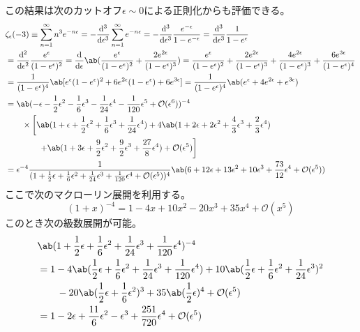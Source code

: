 この結果は次のカットオフ$\epsilon\sim0$による正則化からも評価できる。
\begin{equation}
  \begin{split}
    &\zeta_\epsilon(-3)
    \equiv
    \sum_{n=1}^\infty n^3e^{-n\epsilon}
    =-\odv[order=3]{}{\epsilon} \sum_{n=1}^\infty e^{-n\epsilon}
    =-\odv[order=3]{}{\epsilon} \frac{e^{-\epsilon}}{1-e^{-\epsilon}}
    =\odv[order=3]{}{\epsilon} \frac{1}{1-e^\epsilon} \\
    &=\odv[order=2]{}{\epsilon} \frac{e^\epsilon}{(1-e^\epsilon)^2}
    =\odv{}{\epsilon}\ab(
    \frac{e^\epsilon}{(1-e^\epsilon)^2}
    +\frac{2e^{2\epsilon}}{(1-e^\epsilon)^3}
    )
    =\frac{e^\epsilon}{(1-e^\epsilon)^2}
    +\frac{2e^{2\epsilon}}{(1-e^\epsilon)^3}
    +\frac{4e^{2\epsilon}}{(1-e^\epsilon)^3}
    +\frac{6e^{3\epsilon}}{(1-e^\epsilon)^4} \\
    &=\frac{1}{(1-e^\epsilon)^4}
    \ab[e^\epsilon(1-e^\epsilon)^2+6e^{2\epsilon}(1-e^\epsilon)+6e^{3\epsilon}]
    =\frac{1}{(1-e^\epsilon)^4}
    \ab(e^\epsilon+4e^{2\epsilon}+e^{3\epsilon}) \\
    &=\ab(
    -\epsilon-\frac{1}{2}\epsilon^2-\frac{1}{6}\epsilon^3
    -\frac{1}{24}\epsilon^4-\frac{1}{120}\epsilon^5+\mathcal{O}(\epsilon^6)
    )^{-4} \\
    &\qquad\times\left[
      \ab(1+\epsilon+\frac{1}{2}\epsilon^2+\frac{1}{6}\epsilon^3+\frac{1}{24}\epsilon^4)
      +4\ab(1+2\epsilon+2\epsilon^2+\frac{4}{3}\epsilon^3+\frac{2}{3}\epsilon^4)\right. \\
      &\qquad\qquad\left.
      +\ab(1+3\epsilon+\frac{9}{2}\epsilon^2+\frac{9}{2}\epsilon^3+\frac{27}{8}\epsilon^4)
      +\mathcal{O}(\epsilon^5)
      \right] \\
    &=\epsilon^{-4}\frac{1}{
      (1+\frac{1}{2}\epsilon+\frac{1}{6}\epsilon^2+\frac{1}{24}\epsilon^3
      +\frac{1}{120}\epsilon^4+\mathcal{O}(\epsilon^5))^4}
    \ab(
    6+12\epsilon+13\epsilon^2+10\epsilon^3+\frac{73}{12}\epsilon^4
    +\mathcal{O}(\epsilon^5)
    )
  \end{split}
\end{equation}
ここで次のマクローリン展開を利用する。
\begin{equation}
  (1+x)^{-4}
  =1-4x+10x^2-20x^3+35x^4+\mathcal{O}(x^5)
\end{equation}
このとき次の級数展開が可能。
\begin{equation}
  \begin{split}
    &\ab(1+\frac{1}{2}\epsilon+\frac{1}{6}\epsilon^2+\frac{1}{24}\epsilon^3
    +\frac{1}{120}\epsilon^4)^{-4} \\
    &=1-4\ab(\frac{1}{2}\epsilon+\frac{1}{6}\epsilon^2+
    \frac{1}{24}\epsilon^3+\frac{1}{120}\epsilon^4)
    +10\ab(\frac{1}{2}\epsilon+\frac{1}{6}\epsilon^2+\frac{1}{24}\epsilon^3)^2 \\
    &\qquad
    -20\ab(\frac{1}{2}\epsilon+\frac{1}{6}\epsilon^2)^3
    +35\ab(\frac{1}{2}\epsilon)^4
    +\mathcal{O}(\epsilon^5) \\
    &=1-2\epsilon+\frac{11}{6}\epsilon^2-\epsilon^3+\frac{251}{720}\epsilon^4
    +\mathcal{O}(\epsilon^5)
  \end{split}
\end{equation}
